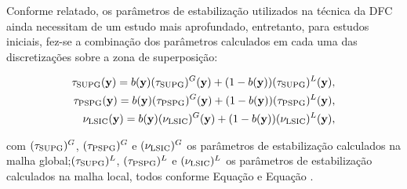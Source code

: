 Conforme relatado, os parâmetros de estabilização utilizados na técnica da DFC ainda necessitam de um estudo mais aprofundado, entretanto, para estudos iniciais, fez-se a combinação dos parâmetros calculados em cada uma das discretizações sobre a zona de superposição:

\begin{align}
	\tau_{\mathrm{SUPG}}(\mathbf{y}) =  b(\mathbf{y})(\tau_{\mathrm{SUPG}})^{G}(\mathbf{y}) + (1-b(\mathbf{y}))(\tau_{\mathrm{SUPG}})^{L}(\mathbf{y}),\\
	\tau_{\mathrm{PSPG}}(\mathbf{y}) =  b(\mathbf{y})(\tau_{\mathrm{PSPG}})^{G}(\mathbf{y}) + (1-b(\mathbf{y}))(\tau_{\mathrm{PSPG}})^{L}(\mathbf{y}),\\
	\nu_{\mathrm{LSIC}}(\mathbf{y}) =  b(\mathbf{y})(\nu_{\mathrm{LSIC}})^{G}(\mathbf{y}) + (1-b(\mathbf{y}))(\nu_{\mathrm{LSIC}})^{L}(\mathbf{y}),
\end{align}

\noindent com $(\tau_{\mathrm{SUPG}})^{G}$, $(\tau_{\mathrm{PSPG}})^{G}$ e $(\nu_{\mathrm{LSIC}})^{G}$ os parâmetros de estabilização calculados na malha global;$(\tau_{\mathrm{SUPG}})^{L}$, $(\tau_{\mathrm{PSPG}})^{L}$ e  $(\nu_{\mathrm{LSIC}})^{L}$ os parâmetros de estabilização calculados na malha local, todos conforme Equação  e Equação .

